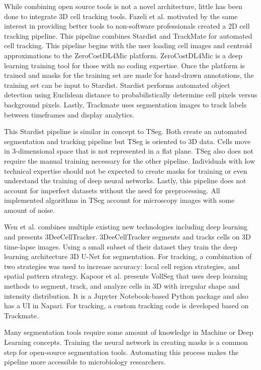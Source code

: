\documentclass[./dissertation.tex]{subfiles}
\begin{document}
While combining open source tools is not a novel architecture, little has been done to integrate 3D cell tracking tools. Fazeli et al. \cite{fazeli2020automated} motivated by the same interest in providing better tools to non-software professionals created a 2D cell tracking pipeline. This pipeline combines Stardist \cite{Weigert_2020} and TrackMate \cite{TINEVEZ201780} for automated cell tracking. This pipeline begins with the user loading cell images and centroid approximations to the ZeroCostDL4Mic \cite{von2021democratising} platform. ZeroCostDL4Mic is a deep learning training tool for those with no coding expertise. Once the platform is trained and masks for the training set are made for hand-drawn annotations, the training set can be input to Stardist. Stardist performs automated object detection using Euclidean distance to probabilistically determine cell pixels versus background pixels. Lastly, Trackmate uses segmentation images to track labels between timeframes and display analytics.

This Stardist pipeline is similar in concept to TSeg. Both create an automated segmentation and tracking pipeline but TSeg is oriented to 3D data. Cells move in 3-dimensional space that is not represented in a flat plane. TSeg also does not require the manual training necessary for the other pipeline. Individuals with low technical expertise should not be expected to create masks for training or even understand the training of deep neural networks. Lastly, this pipeline does not account for imperfect datasets without the need for preprocessing. All implemented algorithms in TSeg account for microscopy images with some amount of noise.

Wen et al. \cite{Wen2021-bn} combines multiple existing new technologies including deep learning and presents 3DeeCellTracker. 3DeeCellTracker segments and tracks cells on 3D time-lapse images. Using a small subset of their dataset they train the deep learning architecture 3D U-Net for segmentation. For tracking, a combination of two strategies was used to increase accuracy: local cell region strategies, and spatial pattern strategy. Kapoor et al. \cite{kapoor2021cell} presents VollSeg that uses deep learning methods to segment, track, and analyze cells in 3D with irregular shape and intensity distribution. It is a Jupyter Notebook-based Python package and also has a UI in Napari. For tracking, a custom tracking code is developed based on Trackmate.

Many segmentation tools require some amount of knowledge in Machine or Deep Learning concepts. Training the neural network in creating masks is a common step for open-source segmentation tools. Automating this process makes the pipeline more accessible to microbiology researchers.
\end{document}
